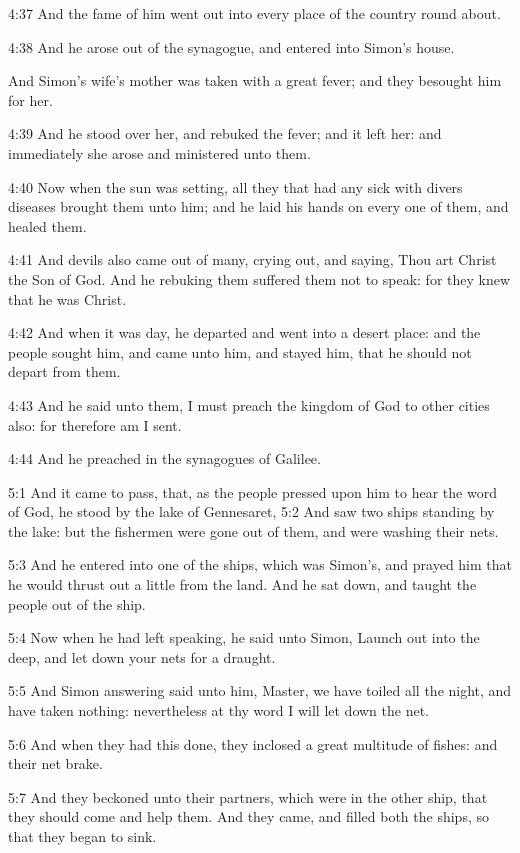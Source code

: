 4:37 And the fame of him went out into every place of the country
round about.

4:38 And he arose out of the synagogue, and entered into Simon's
house.

And Simon's wife's mother was taken with a great fever; and they
besought him for her.

4:39 And he stood over her, and rebuked the fever; and it left her:
and immediately she arose and ministered unto them.

4:40 Now when the sun was setting, all they that had any sick with
divers diseases brought them unto him; and he laid his hands on every
one of them, and healed them.

4:41 And devils also came out of many, crying out, and saying, Thou
art Christ the Son of God. And he rebuking them suffered them not to
speak: for they knew that he was Christ.

4:42 And when it was day, he departed and went into a desert place:
and the people sought him, and came unto him, and stayed him, that he
should not depart from them.

4:43 And he said unto them, I must preach the kingdom of God to other
cities also: for therefore am I sent.

4:44 And he preached in the synagogues of Galilee.

5:1 And it came to pass, that, as the people pressed upon him to hear
the word of God, he stood by the lake of Gennesaret, 5:2 And saw two
ships standing by the lake: but the fishermen were gone out of them,
and were washing their nets.

5:3 And he entered into one of the ships, which was Simon's, and
prayed him that he would thrust out a little from the land. And he sat
down, and taught the people out of the ship.

5:4 Now when he had left speaking, he said unto Simon, Launch out into
the deep, and let down your nets for a draught.

5:5 And Simon answering said unto him, Master, we have toiled all the
night, and have taken nothing: nevertheless at thy word I will let
down the net.

5:6 And when they had this done, they inclosed a great multitude of
fishes: and their net brake.

5:7 And they beckoned unto their partners, which were in the other
ship, that they should come and help them. And they came, and filled
both the ships, so that they began to sink.

